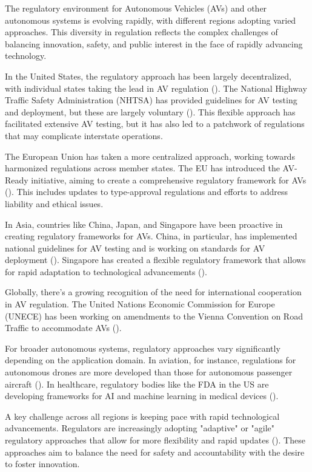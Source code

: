 The regulatory environment for Autonomous Vehicles (AVs) and other autonomous systems is evolving rapidly, with different regions adopting varied approaches. This diversity in regulation reflects the complex challenges of balancing innovation, safety, and public interest in the face of rapidly advancing technology.

In the United States, the regulatory approach has been largely decentralized, with individual states taking the lead in AV regulation (\cite{Claybrook2018}). The National Highway Traffic Safety Administration (NHTSA) has provided guidelines for AV testing and deployment, but these are largely voluntary (\cite{nhtsa2020}). This flexible approach has facilitated extensive AV testing, but it has also led to a patchwork of regulations that may complicate interstate operations.

The European Union has taken a more centralized approach, working towards harmonized regulations across member states. The EU has introduced the AV-Ready initiative, aiming to create a comprehensive regulatory framework for AVs (\cite{EuropeanCommission2020}). This includes updates to type-approval regulations and efforts to address liability and ethical issues.

In Asia, countries like China, Japan, and Singapore have been proactive in creating regulatory frameworks for AVs. China, in particular, has implemented national guidelines for AV testing and is working on standards for AV deployment (\cite{Du2020}). Singapore has created a flexible regulatory framework that allows for rapid adaptation to technological advancements (\cite{Taeihagh2019}).

Globally, there's a growing recognition of the need for international cooperation in AV regulation. The United Nations Economic Commission for Europe (UNECE) has been working on amendments to the Vienna Convention on Road Traffic to accommodate AVs (\cite{UNECE2021}).

For broader autonomous systems, regulatory approaches vary significantly depending on the application domain. In aviation, for instance, regulations for autonomous drones are more developed than those for autonomous passenger aircraft (\cite{Hodgkinson2018}). In healthcare, regulatory bodies like the FDA in the US are developing frameworks for AI and machine learning in medical devices (\cite{FDA2021}).

A key challenge across all regions is keeping pace with rapid technological advancements. Regulators are increasingly adopting "adaptive" or "agile" regulatory approaches that allow for more flexibility and rapid updates (\cite{Eggers2019}). These approaches aim to balance the need for safety and accountability with the desire to foster innovation.

